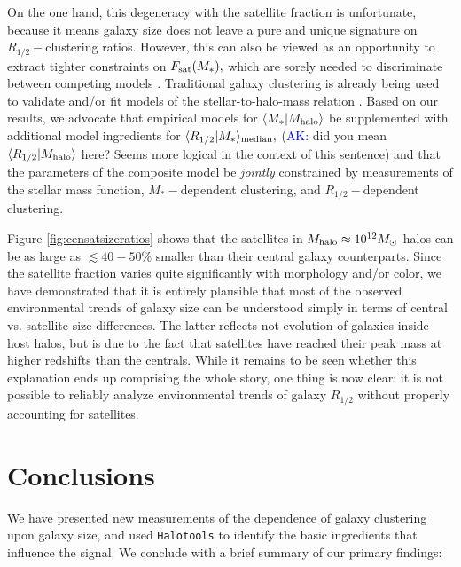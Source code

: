 \documentclass[usenatbib,usegraphicx,letterpaper]{mn2e}
\newcommand{\rhalf}{R_{1/2}}
\newcommand{\mstar}{M_{\ast}}
\newcommand{\mhalo}{M_{\rm halo}}
\newcommand{\mean}[2]{\langle{#1}\vert{#2}\rangle}
\newcommand{\median}[2]{\langle{#1}\vert{#2}\rangle_{\rm median}}
\newcommand{\msun}{M_\odot}
\begin{document}
On the one hand, this degeneracy with the satellite fraction is unfortunate, because it means galaxy size does not leave a pure and unique signature on $\rhalf-$clustering ratios. However, this can also be viewed as an opportunity to extract tighter constraints on $F_{\rm sat}(\mstar),$ which are sorely needed to discriminate between competing models \citep{watson_conroy13}. Traditional galaxy clustering is already being used to validate and/or fit models of the stellar-to-halo-mass relation \citep[e.g.,][]{leauthaud_etal11,moster_etal13,behroozi13_smhm,lehmann_etal15}. Based on our results, we advocate that empirical models for $\mean{\mstar}{\mhalo}$ be supplemented with additional model ingredients for $\median{\rhalf}{\mstar},$ (\textcolor{blue}{AK:} did you mean $\langle\rhalf|\mhalo\rangle$ here? Seems more logical in the context of this sentence) and that the parameters of the composite model be {\em jointly} constrained by measurements of the stellar mass function, $\mstar-$dependent clustering, and $\rhalf-$dependent clustering.

Figure \ref{fig:censatsizeratios} shows that the satellites in $\mhalo\approx10^{12}\msun$ halos can be as large as $\lesssim40-50\%$ smaller than their central galaxy counterparts. Since the satellite fraction varies quite significantly with morphology and/or color, we have demonstrated that it is entirely plausible that most of the observed environmental trends of galaxy size can be understood simply in terms of central vs. satellite size differences. The latter reflects not evolution of galaxies inside host halos, but is due to the fact that satellites have reached their peak mass at higher redshifts than the centrals. While it remains to be seen whether this explanation ends up comprising the whole story, one thing is now clear: it is not possible to reliably analyze environmental trends of galaxy $\rhalf$ without properly accounting for satellites. %

\section{Conclusions}
\label{sec:conclusion}

We have presented new measurements of the dependence of galaxy clustering upon galaxy size, and used {\tt Halotools} to identify the basic ingredients that influence the signal. We conclude with a brief summary of our primary findings:
\end{document}
